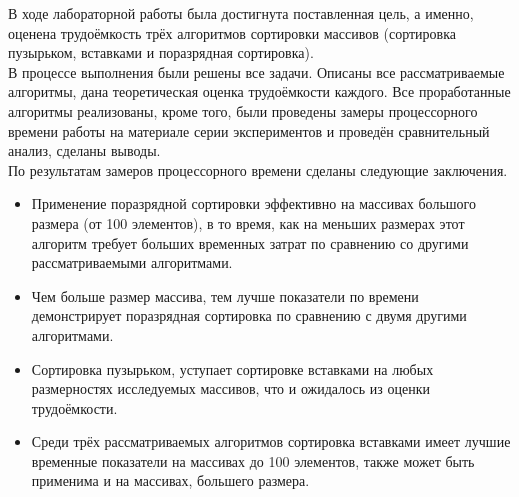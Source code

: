 В ходе лабораторной работы была достигнута поставленная цель, а именно, оценена трудоёмкость трёх алгоритмов сортировки массивов (сортировка пузырьком, вставками и поразрядная сортировка).  \\

В процессе выполнения были решены все задачи. Описаны все рассматриваемые алгоритмы, дана теоретическая оценка трудоёмкости каждого. Все проработанные алгоритмы реализованы, кроме того, были проведены замеры процессорного времени работы на материале серии экспериментов и проведён сравнительный анализ, сделаны выводы.\\

По результатам замеров процессорного времени сделаны следующие заключения.
\begin{itemize}
	\item Применение поразрядной сортировки эффективно на массивах большого размера (от 100 элементов), в то время, как на меньших размерах этот алгоритм требует больших временных затрат по сравнению со другими рассматриваемыми алгоритмами.
	\item Чем больше размер массива, тем лучше показатели по времени демонстрирует поразрядная сортировка по сравнению с двумя другими алгоритмами.
	\item Сортировка пузырьком, уступает сортировке вставками на любых размерностях исследуемых массивов, что и ожидалось из оценки трудоёмкости.
	\item Среди трёх рассматриваемых алгоритмов сортировка вставками имеет лучшие временные показатели на массивах до 100 элементов, также может быть применима и на массивах, большего размера.
\end{itemize}
